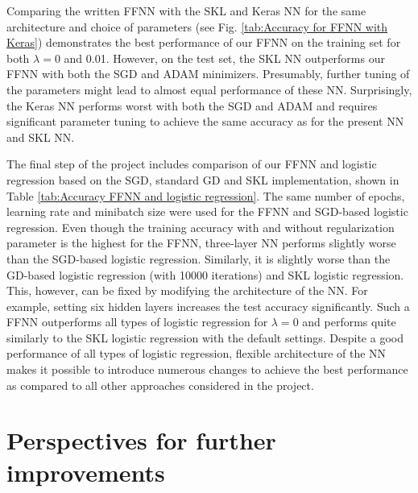 \documentclass{emulateapj}
\begin{document}
Comparing the written FFNN with the SKL and Keras NN for the same architecture and choice of parameters (see Fig. \ref{tab:Accuracy for FFNN with Keras}) demonstrates the best performance of our FFNN on the training set for both $\lambda=0$ and 0.01. However, on the test set, the SKL NN outperforms our FFNN with both the SGD and ADAM minimizers. Presumably, further tuning of the parameters might lead to almost equal performance of these NN. Surprisingly, the Keras NN performs worst with both the SGD and ADAM and requires significant parameter tuning to achieve the same accuracy as for the present NN and SKL NN.


The final step of the project includes comparison of our FFNN and logistic regression based on the SGD, standard GD and SKL implementation, shown in Table \ref{tab:Accuracy FFNN and logistic regression}. The same number of epochs, learning rate and minibatch size were used for the FFNN and SGD-based logistic regression. Even though the training accuracy with and without regularization parameter is the highest for the FFNN, three-layer NN performs slightly worse than the SGD-based logistic regression. Similarly, it is slightly worse than the GD-based logistic regression (with 10000 iterations) and SKL logistic regression. This, however, can be fixed by modifying the architecture of the NN. For example, setting six hidden layers increases the test accuracy significantly. Such a FFNN outperforms all types of logistic regression for $\lambda=0$ and performs quite similarly to the SKL logistic regression with the default settings. Despite a good performance of all types of logistic regression, flexible architecture of the NN makes it possible to introduce numerous changes to achieve the best performance as compared to all other approaches considered in the project. 

\section{Perspectives for further improvements} 
\label{sec: Improvements}
\end{document}
